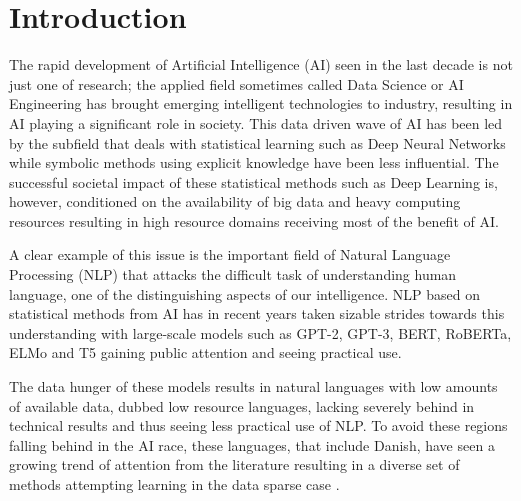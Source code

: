 \documentclass[main.tex]{subfiles}
\begin{document}
\chapter{Introduction}
The rapid development of Artificial Intelligence (AI) seen in the last decade is not just one of research;
the applied field sometimes called Data Science or AI Engineering has brought emerging intelligent technologies to industry, resulting in AI playing a significant role in society.
This data driven wave of AI has been led by the subfield that deals with statistical learning such as Deep Neural Networks while symbolic methods using explicit knowledge have been less influential.
The successful societal impact of these statistical methods such as Deep Learning is, however, conditioned on the availability of big data and heavy computing resources resulting in high resource domains receiving most of the benefit of AI.

A clear example of this issue is the important field of Natural Language Processing (NLP) that attacks the difficult task of understanding human language, one of the distinguishing aspects of our intelligence.
NLP based on statistical methods from AI has in recent years taken sizable strides towards this understanding with large-scale models such as GPT-2, GPT-3, BERT, RoBERTa, ELMo and T5 gaining public attention and seeing practical use.

The data hunger of these models results in natural languages with low amounts of available data, dubbed low resource languages, lacking severely behind in technical results and thus seeing less practical use of NLP.
To avoid these regions falling behind in the AI race, these languages, that include Danish, have seen a growing trend of attention from the literature resulting in a diverse set of methods attempting learning in the data sparse case \cite{hedderich2021survey}.
\end{document}

